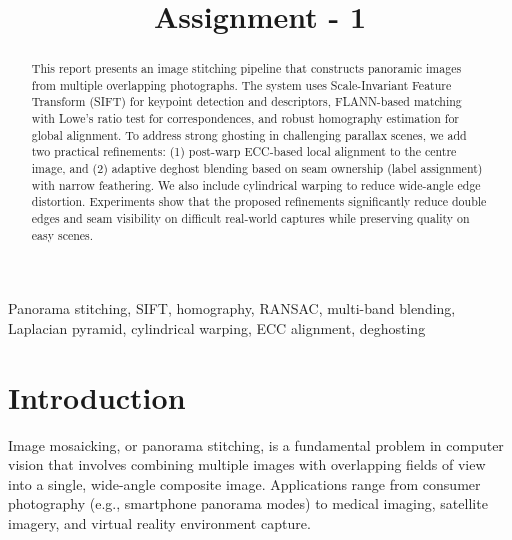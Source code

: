 \documentclass[conference]{IEEEtran}
\title{Assignment - 1}
\author{
  \IEEEauthorblockN{Madhav Kataria}
  \IEEEauthorblockA{
    Roll No: B23CH1025 \\
    Email: b23ch1025@iitj.ac.in
  }
}
\begin{document}
\maketitle

\begin{abstract}
This report presents an image stitching pipeline that constructs panoramic
images from multiple overlapping photographs. The system uses Scale-Invariant
Feature Transform (SIFT) for keypoint detection and descriptors, FLANN-based
matching with Lowe's ratio test for correspondences, and robust homography
estimation for global alignment. To address strong ghosting in challenging
parallax scenes, we add two practical refinements: (1) post-warp
ECC-based local alignment to the centre image, and (2) adaptive deghost
blending based on seam ownership (label assignment) with narrow feathering.
We also include cylindrical warping to reduce wide-angle edge distortion.
Experiments show that the proposed refinements significantly reduce double
edges and seam visibility on difficult real-world captures while preserving
quality on easy scenes.
\end{abstract}

\begin{IEEEkeywords}
Panorama stitching, SIFT, homography, RANSAC, multi-band blending,
Laplacian pyramid, cylindrical warping, ECC alignment, deghosting
\end{IEEEkeywords}


\section{Introduction}

Image mosaicking, or panorama stitching, is a fundamental problem in computer
vision that involves combining multiple images with overlapping fields of view
into a single, wide-angle composite image. Applications range from consumer
photography (e.g., smartphone panorama modes) to medical imaging, satellite
imagery, and virtual reality environment capture.
\end{document}
